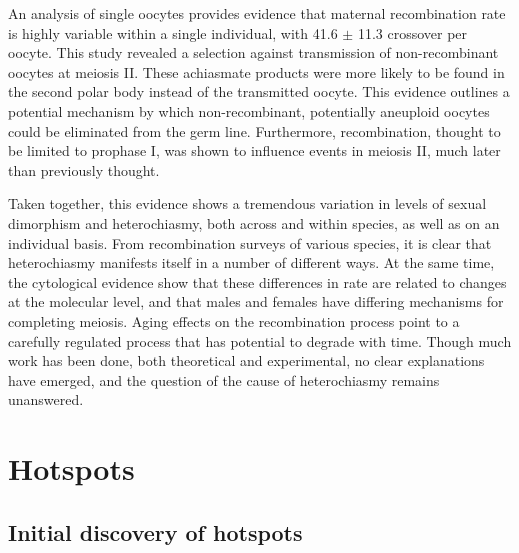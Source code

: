 An analysis of single oocytes provides evidence that maternal recombination rate is highly variable within a single individual, with 41.6 $\pm$ 11.3 crossover per oocyte\cite{Ottolini2015}.
This study revealed a selection against transmission of non-recombinant oocytes at meiosis II.
These achiasmate products were more likely to be found in the second polar body instead of the transmitted oocyte.
This evidence outlines a potential mechanism by which non-recombinant, potentially aneuploid oocytes could be eliminated from the germ line.
Furthermore, recombination, thought to be limited to prophase I, was shown to influence events in meiosis II, much later than previously thought.

Taken together, this evidence shows a tremendous variation in levels of sexual dimorphism and heterochiasmy, both across and within species, as well as on an individual basis.
From recombination surveys of various species, it is clear that heterochiasmy manifests itself in a number of different ways.
At the same time, the cytological evidence show that these differences in rate are related to changes at the molecular level, and that males and females have differing mechanisms for completing meiosis.
Aging effects on the recombination process point to a carefully regulated process that has potential to degrade with time.
Though much work has been done, both theoretical and experimental, no clear explanations have emerged, and the question of the cause of heterochiasmy remains unanswered.



\section{Hotspots}

\subsection{Initial discovery of hotspots}

